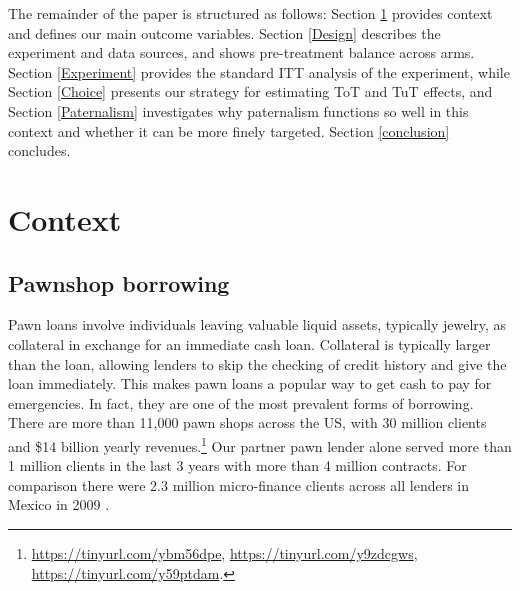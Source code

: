 \documentclass[oneside,11pt]{article}
\begin{document}



The remainder of the paper is structured as follows:  Section \ref{context} provides context and defines our main outcome variables. Section \ref{Design} describes the experiment and data sources, and shows pre-treatment balance across arms. Section \ref{Experiment} provides the standard ITT analysis of the experiment, while Section \ref{Choice} presents our strategy for estimating ToT and TuT effects, and Section \ref{Paternalism} investigates why paternalism functions so well in this context and whether it can be more finely targeted.  Section \ref{conclusion} concludes.






\section{Context} \label{context}

\subsection{Pawnshop borrowing}
    
Pawn loans involve individuals leaving valuable liquid assets, typically jewelry, as collateral in exchange for an immediate cash loan. Collateral is typically larger than the loan, allowing lenders to skip the checking of credit history and give the loan immediately. This makes pawn loans a popular way to get cash to pay for emergencies. In fact, they are one of the most prevalent forms of borrowing. There are more than 11,000 pawn shops across the US, with 30 million clients and \$14 billion yearly revenues.\footnote{\url{https://tinyurl.com/ybm56dpe}, \url{https://tinyurl.com/y9zdcgws}, \url{https://tinyurl.com/y59ptdam}.} Our partner pawn lender alone served more than 1 million clients in the last 3 years with more than 4 million contracts. For comparison there were 2.3 million micro-finance clients across all lenders in Mexico in 2009 \citep{Pedroza:2010}. 
\end{document}
